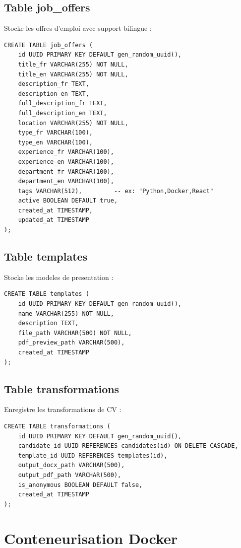 \subsection{Table job\_offers}

Stocke les offres d'emploi avec support bilingue :

\begin{verbatim}
CREATE TABLE job_offers (
    id UUID PRIMARY KEY DEFAULT gen_random_uuid(),
    title_fr VARCHAR(255) NOT NULL,
    title_en VARCHAR(255) NOT NULL,
    description_fr TEXT,
    description_en TEXT,
    full_description_fr TEXT,
    full_description_en TEXT,
    location VARCHAR(255) NOT NULL,
    type_fr VARCHAR(100),
    type_en VARCHAR(100),
    experience_fr VARCHAR(100),
    experience_en VARCHAR(100),
    department_fr VARCHAR(100),
    department_en VARCHAR(100),
    tags VARCHAR(512),         -- ex: "Python,Docker,React"
    active BOOLEAN DEFAULT true,
    created_at TIMESTAMP,
    updated_at TIMESTAMP
);
\end{verbatim}

\subsection{Table templates}

Stocke les modeles de presentation :

\begin{verbatim}
CREATE TABLE templates (
    id UUID PRIMARY KEY DEFAULT gen_random_uuid(),
    name VARCHAR(255) NOT NULL,
    description TEXT,
    file_path VARCHAR(500) NOT NULL,
    pdf_preview_path VARCHAR(500),
    created_at TIMESTAMP
);
\end{verbatim}

\subsection{Table transformations}

Enregistre les transformations de CV :

\begin{verbatim}
CREATE TABLE transformations (
    id UUID PRIMARY KEY DEFAULT gen_random_uuid(),
    candidate_id UUID REFERENCES candidates(id) ON DELETE CASCADE,
    template_id UUID REFERENCES templates(id),
    output_docx_path VARCHAR(500),
    output_pdf_path VARCHAR(500),
    is_anonymous BOOLEAN DEFAULT false,
    created_at TIMESTAMP
);
\end{verbatim}

\section{Conteneurisation Docker}

